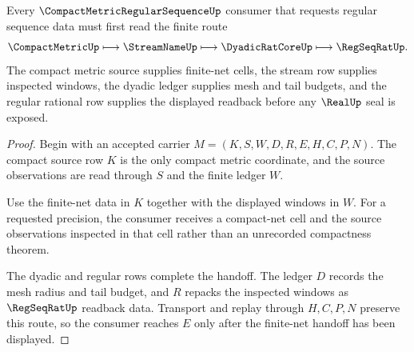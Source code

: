 \begin{theorem}
\label{thm:compact-metric-regular-sequence-finite-net-handoff}
Every $\CompactMetricRegularSequenceUp$ consumer that requests regular sequence data must first read the finite route
$$
\CompactMetricUp \longmapsto \StreamNameUp \longmapsto \DyadicRatCoreUp \longmapsto \RegSeqRatUp .
$$
The compact metric source supplies finite-net cells, the stream row supplies inspected windows, the dyadic ledger supplies mesh and tail budgets, and the regular rational row supplies the displayed readback before any $\RealUp$ seal is exposed.
\end{theorem}
\begin{proof}
Begin with an accepted carrier $M=(K,S,W,D,R,E,H,C,P,N)$. The compact source row $K$ is the only compact metric coordinate, and the source observations are read through $S$ and the finite ledger $W$.

Use the finite-net data in $K$ together with the displayed windows in $W$. For a requested precision, the consumer receives a compact-net cell and the source observations inspected in that cell rather than an unrecorded compactness theorem.

The dyadic and regular rows complete the handoff. The ledger $D$ records the mesh radius and tail budget, and $R$ repacks the inspected windows as $\RegSeqRatUp$ readback data. Transport and replay through $H,C,P,N$ preserve this route, so the consumer reaches $E$ only after the finite-net handoff has been displayed.
\end{proof}

